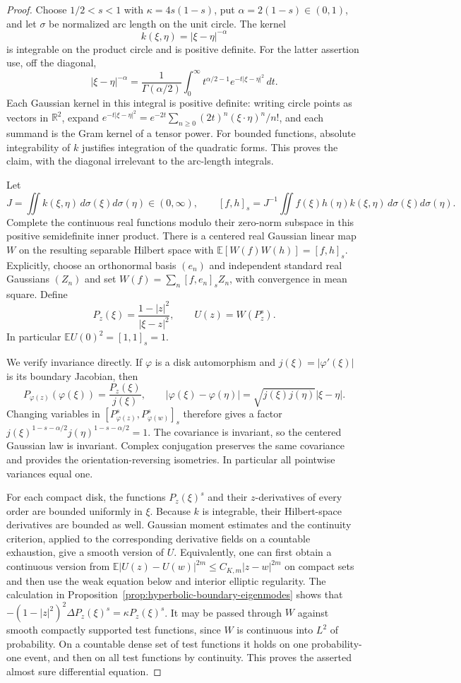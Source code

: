 \documentclass[11pt,a4paper]{article}
\numberwithin{equation}{section}
\theoremstyle{definition}
\theoremstyle{remark}
\newcommand{\E}{\mathbb E}
\begin{document}
\begin{proof}
Choose $1/2<s<1$ with $\kappa=4s(1-s)$, put
$\alpha=2(1-s)\in(0,1)$, and let $\sigma$ be normalized arc length
on the unit circle.  The kernel
\[
 k(\xi,\eta)=|\xi-\eta|^{-\alpha}
\]
is integrable on the product circle and is positive definite.
For the latter assertion use, off the diagonal,
\[
 |\xi-\eta|^{-\alpha}
  =\frac1{\Gamma(\alpha/2)}\int_0^\infty
        t^{\alpha/2-1}e^{-t|\xi-\eta|^2}\,dt.
\]
Each Gaussian kernel in this integral is positive definite: writing
circle points as vectors in $\mathbb R^2$, expand
$e^{-t|\xi-\eta|^2}=e^{-2t}\sum_{n\ge0}(2t)^n
(\xi\cdot\eta)^n/n!$, and each summand is the Gram kernel of
a tensor power.  For bounded functions, absolute integrability of
$k$ justifies integration of the quadratic forms.  This proves the
claim, with the diagonal irrelevant to the arc-length integrals.

Let
\[
 J=\iint k(\xi,\eta)\,d\sigma(\xi)d\sigma(\eta)\in(0,\infty),
 \qquad
 [f,h]_s=J^{-1}\iint f(\xi)h(\eta)k(\xi,\eta)
                          \,d\sigma(\xi)d\sigma(\eta).
\]
Complete the continuous real functions modulo their zero-norm
subspace in this positive semidefinite inner product.  There is a
centered real Gaussian linear map $W$ on the resulting separable
Hilbert space with $\E[W(f)W(h)]=[f,h]_s$.  Explicitly, choose an
orthonormal basis $(e_n)$ and independent standard real Gaussians
$(Z_n)$ and set $W(f)=\sum_n[f,e_n]_sZ_n$, with convergence in
mean square.  Define
\[
 P_z(\xi)=\frac{1-|z|^2}{|\xi-z|^2},
 \qquad U(z)=W(P_z^s).
\]
In particular $\E U(0)^2=[1,1]_s=1$.

We verify invariance directly.  If $\varphi$ is a disk automorphism
and $j(\xi)=|\varphi'(\xi)|$ is its boundary Jacobian, then
\[
 P_{\varphi(z)}(\varphi(\xi))=\frac{P_z(\xi)}{j(\xi)},
 \qquad
 |\varphi(\xi)-\varphi(\eta)|
       =\sqrt{j(\xi)j(\eta)}|\xi-\eta|.
\]
Changing variables in $[P_{\varphi(z)}^s,P_{\varphi(w)}^s]_s$
therefore gives a factor
$j(\xi)^{1-s-\alpha/2}j(\eta)^{1-s-\alpha/2}=1$.
The covariance is invariant, so the centered Gaussian law is
invariant.  Complex conjugation preserves the same covariance and
provides the orientation-reversing isometries.  In particular all
pointwise variances equal one.

For each compact disk, the functions $P_z(\xi)^s$ and their
$z$-derivatives of every order are bounded uniformly in $\xi$.
Because $k$ is integrable, their Hilbert-space derivatives are
bounded as well.  Gaussian moment estimates and the continuity
criterion, applied to the corresponding derivative fields on a
countable exhaustion, give a smooth version of $U$.  Equivalently,
one can first obtain a continuous version from
$\E|U(z)-U(w)|^{2m}\le C_{K,m}|z-w|^{2m}$ on compact sets and
then use the weak equation below and interior elliptic regularity.
The calculation in
Proposition~\ref{prop:hyperbolic-boundary-eigenmodes} shows that
$-(1-|z|^2)^2\Delta P_z(\xi)^s=\kappa P_z(\xi)^s$.
It may be passed through $W$ against smooth compactly supported
test functions, since $W$ is continuous into $L^2$ of probability.
On a countable dense set of test functions it holds on one
probability-one event, and then on all test functions by continuity.
This proves the asserted almost sure differential equation.


\end{proof}
\end{document}
